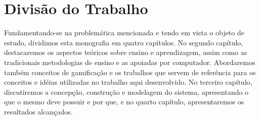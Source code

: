 \section{Divisão do Trabalho}

Fundamentando-se na problemática mencionada e tendo em vista o objeto de estudo, dividimos esta monografia em quatro capítulos. No 
segundo cap\'itulo, destacaremos os aspectos teóricos sobre ensino e aprendizagem, assim como as tradicionais metodologias de ensino e as 
apoiadas por computador. Abordaremos tamb\'em conceitos de gamificação e os trabalhos que servem de refer\^encia para os conceitos e 
id\'eias utilizadas no trabalho aqui desenvolvido. No terceiro capítulo, discutiremos a concepção, construção e modelagem do sistema, 
apresentando o que o mesmo deve possuir e por que, e no quarto capítulo, apresentaremos os resultados alcan\c{c}ados.